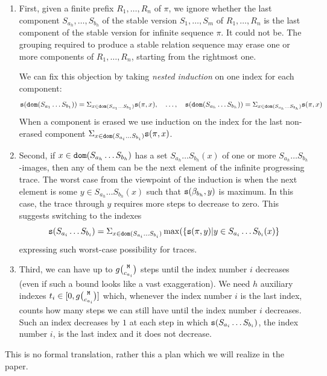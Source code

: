 \documentclass{lmcs}
\begin{document}
\begin{enumerate}

\item
First, given a finite prefix $R_1, \ldots, R_n$ of $\pi$, we ignore whether the last component 
$S_{a_{h}}, \ldots, S_{b_h}$ of the stable version $S_1, \ldots, S_m$ of $R_1, \ldots, R_n$ 
is the last component of the stable version for infinite sequence $\pi$. It could not be.
The grouping required to produce a stable relation sequence may erase one or more components 
of $R_1, \ldots, R_n$, starting from the rightmost one. 

We can fix this objection by taking \emph{nested induction} on one index for each component:
$$
\size(\dom(S_{a_1} \ldots S_{b_1})) 
=
\Sigma_{x \in \dom(S_{a_1}\ldots S_{b_1})} \size(\pi,x), \ \ \ 
\ldots, \ \ \ 
\size(\dom(S_{a_h} \ldots S_{b_h})) 
=
\Sigma_{x \in \dom(S_{a_h}\ldots S_{b_h})} \size(\pi,x)
$$
When a component is erased we use induction on the index for the last non-erased component
$\Sigma_{x \in {\tt dom}(S_{a_i}\ldots S_{b_i})} {\tt s}(\pi,x)$.

\item
Second, if $x \in {\tt dom}(S_{a_h}\ldots S_{b_h})$ has a set 
$S_{a_h}\ldots S_{b_h}(x)$ of one or more $S_{a_h}\ldots S_{b_h}$-images, 
then any of them can be the next element of the infinite progressing trace. 
The worst case from the viewpoint of the induction is when the next element is 
some $y \in S_{a_h}\ldots S_{b_h}(x)$ such that ${\tt s}(\beta_{b_h},y)$ is maximum.
In this case, the trace through $y$ requires more steps to decrease to zero. 
This suggests switching to the indexes
$$
{\tt s}(S_{a_i} \ldots S_{b_i}) 
=
\Sigma_{x \in {\tt dom}(S_{a_i} \ldots S_{b_i})} 
\max(\{{\tt s}(\pi,y) | y \in S_{a_i} \ldots S_{b_i}(x)\}
$$
expressing such worst-case possibility for traces.

\item
Third, we can have up to $g \newton{\MaxInd}{c_{a_i}}$ steps until the index number $i$
decreases (even if such a bound looks like a vast exaggeration). We need $h$ auxiliary indexes
$t_i \in [0, g \newton{\MaxInd}{c_{a_i}}]$ which, whenever the index number $i$ 
is the last index, counts how many steps we can still have until the index number $i$ decreases. 
Such an index decreases by $1$ at each step in which ${\tt s}(S_{a_i} \ldots S_{b_i}) $,
the index number $i$, is the last index and it does not decrease.

\end{enumerate}

This is no formal translation, rather this a plan which we will realize in the paper. 
\end{document}
